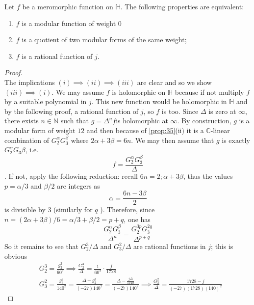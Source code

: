 \documentclass[12pt]{article}
\theoremstyle{definition}
\begin{document}
\begin{prop}
Let \(f\) be a meromorphic function on \(\mathbb{H}\). The following properties are equivalent:
\begin{enumerate}
    \item \(f\) is a modular function of weight \(0\)
    \item \(f\) is a quotient of two modular forms of the same weight;
    \item \(f\) is a rational function of \(j\). 
\end{enumerate}
\end{prop}
\begin{proof}~\\
The implications \((i)\implies (ii)\implies (iii)\) are clear and so we show \((iii)\implies (i)\).\newline
We may assume \(f\) is holomorphic on \(\mathbb{H} \) because if not multiply \(f\) by a suitable polynomial in \(j\). This new function would be holomorphic in \(\mathbb{H} \) and by the following proof, a rational function of \(j\), so \(f\) is too.\newline
Since \(\Delta \) is zero at \(\infty \), there exists \(n\in\mathbb{N} \) such that \(g=\Delta ^nf\)is holomorphic at \(\infty \). By construction, \(g\) is a modular form of weight \(12\) and then because of \cref{prop:35}(ii) it is a \(\mathbb{C} \)-linear combination of \(G_2^\alpha G_3^\beta \) where \(2\alpha +3\beta =6n\). We may then assume that \(g\) is exactly \(G_2^\alpha G_3\beta \), i.e.
\[
    f=\frac{G_2^\alpha G_3^\beta }{\Delta }
\]. If not, apply the following reduction: recall \(6n=2;\alpha+3\beta \), thus the values \(p=\alpha /3\) and \(\beta /2\) are integers as
\[
    \alpha =\frac{6n-3\beta }{2}
\] 
is divisible by \(3\) (similarly for \(q\) ).
Therefore, since \(n=(2\alpha +3\beta )/6=\alpha /3+\beta /2=p+q\), one has 
\[
    \frac{G_2^\alpha G_3^\beta }{\Delta ^n}=\frac{G_2^{3p}G_3^{2q}}{\Delta ^{p+q}}
\]     
So it remains to see that \(G_2^3/\Delta \) and \(G_3^2/\Delta \) are rational functions in \(j\); this is obvious 
\begin{align*}
&G_2^3=\frac{g_2^3}{60^3} \implies \frac{G_2^3}{\Delta }=\frac{1}{60^3}\cdot \frac{j}{1728}\\
&G_3^2=\frac{g_3^2}{140^2}=\frac{\Delta -g_2^3}{(-27)140^2} =\frac{\Delta -\frac{j \Delta }{1728}}{(-27)140^2} \implies \frac{G_3^2}{\Delta } = \frac{1728-j}{(-27)(1728)(140)^2}
\end{align*}
\end{proof}
\end{document}
